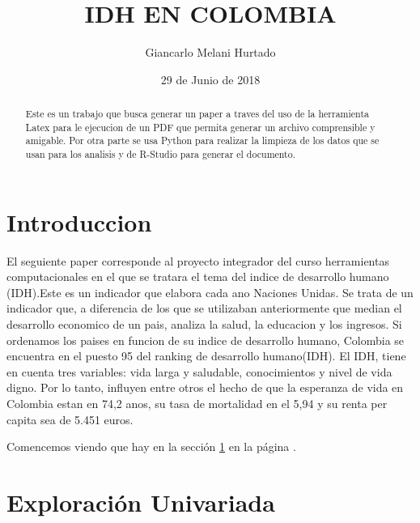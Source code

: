 \documentclass{article}
\title{IDH EN COLOMBIA}
\author[1]{\normalsize Giancarlo Melani Hurtado}
\affil[1,2]{\small  Departamento de Ingenieria,Universidad de los Andes\\
\texttt{{g.melani10}@uniandes.edu.col}}
\affil[1]{\small Curso de verano, herramientas computacionales\\
Uniandes\\
\texttt{delcurso@bp.com.col}}
\date{29 de Junio de 2018}
\begin{document}



\maketitle


\begin{abstract}
Este es un trabajo que busca generar un paper a traves del uso de la herramienta Latex para le ejecucion de un PDF que permita generar un archivo comprensible y amigable. Por otra parte se usa Python para realizar la limpieza de los datos que se usan para los analisis y de R-Studio para generar el documento.

\end{abstract}

\section*{Introduccion}

El seguiente paper corresponde al proyecto integrador del curso herramientas computacionales en el que se tratara el tema del indice de desarrollo humano (IDH).Este es un indicador que elabora cada ano Naciones Unidas. Se trata de un indicador que, a diferencia de los que se utilizaban anteriormente que median el desarrollo economico de un pais, analiza la salud, la educacion y los ingresos.
Si ordenamos los paises en funcion de su indice de desarrollo humano, Colombia se encuentra en el puesto 95 del ranking de desarrollo humano(IDH). El IDH, tiene en cuenta tres variables: vida larga y saludable, conocimientos y nivel de vida digno. Por lo tanto, influyen entre otros el hecho de que la esperanza de vida en Colombia estan en 74,2 anos, su tasa de mortalidad en el 5,94 y su renta per capita sea de 5.451 euros.

Comencemos viendo que hay en la sección \ref{univariada} en la página \pageref{univariada}.

\clearpage

\section{Exploración Univariada}\label{univariada}
\end{document}
